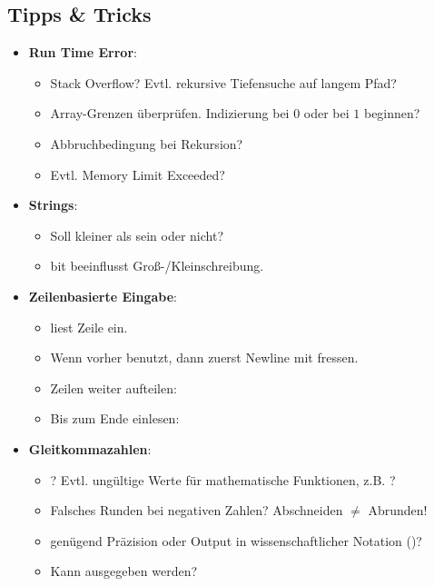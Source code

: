 \subsection{Tipps \& Tricks}

\begin{itemize}
	\item \textbf{Run Time Error}:
	\begin{itemize}
		\item Stack Overflow? Evtl. rekursive Tiefensuche auf langem Pfad?
		\item Array-Grenzen überprüfen. Indizierung bei $0$ oder bei $1$ beginnen?
		\item Abbruchbedingung bei Rekursion?
		\item Evtl. Memory Limit Exceeded?
	\end{itemize}
	
	\item \textbf{Strings}:
	\begin{itemize}
		\item Soll  kleiner als  sein oder nicht?
		\item bit  beeinflusst Groß-/Kleinschreibung.
	\end{itemize}
	
	\item \textbf{Zeilenbasierte Eingabe}:
	\begin{itemize}
		\item {} liest Zeile ein.
		\item Wenn vorher  benutzt, dann zuerst Newline mit  fressen.
		\item Zeilen weiter aufteilen: 
		\item Bis zum Ende einlesen: 
	\end{itemize}

	\item \textbf{Gleitkommazahlen}:
	\begin{itemize}
		\item {}? Evtl. ungültige Werte für mathematische Funktionen, z.B. \mbox{}?
		\item Falsches Runden bei negativen Zahlen? Abschneiden $\neq$ Abrunden!
		\item genügend Präzision oder Output in wissenschaftlicher Notation ()?
		\item Kann  ausgegeben werden?
	\end{itemize}


\end{itemize}
